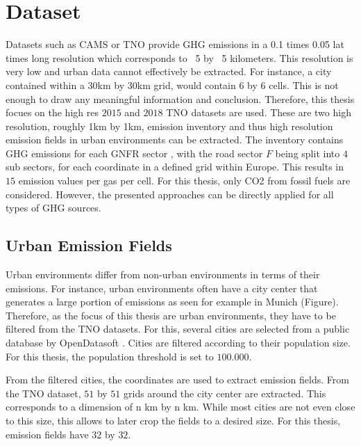 
\chapter{Dataset}\label{chapter:dataset}

Datasets such as CAMS \parencite{CAMS} or TNO \parencite{TNO_LowRes}  provide GHG emissions in a 0.1 times 0.05 lat times long resolution which corresponds to ~5 by ~5 kilometers.
This resolution is very low and urban data cannot effectively be extracted.
For instance, a city contained within a 30km by 30km grid, would contain 6 by 6 cells.
This is not enough to draw any meaningful information and conclusion. 
Therefore, this thesis focues on the high res $2015$ \parencite{TNO_HighRes15} and $2018$ \parencite{TNO_HighRes18} TNO datasets are used.
These are two high resolution, roughly 1km by 1km, emission inventory and thus high resolution emission fields in urban environments can be extracted.
The inventory contains GHG emissions for each GNFR sector \parencite{GNFR_Sectors}, with the road sector $F$ being split into $4$ sub sectors, for each coordinate in a defined grid within Europe.
This results in $15$ emission values per gas per cell.
For this thesis, only CO2 from fossil fuels are considered.
However, the presented approaches can be directly applied for all types of GHG sources.

\section{Urban Emission Fields}
Urban environments differ from non-urban environments in terms of their emissions.
For instance, urban environments often have a city center that generates a large portion of emissions as seen for example in Munich (Figure).
Therefore, as the focus of this thesis are urban environments, they have to be filtered from the TNO datasets.
For this, several cities are selected from a public database by OpenDatasoft \parencite{OpenDataSoft}.
Cities are filtered according to their population size.
For this thesis, the population threshold is set to $100.000$.

From the filtered cities, the coordinates are used to extract emission fields.
From the TNO dataset, $51$ by $51$ grids around the city center are extracted.
This corresponds to a dimension of n km by n km.
While most cities are not even close to this size, this allows to later crop the fields to a desired size.
For this thesis, emission fields have $32$ by $32$.

